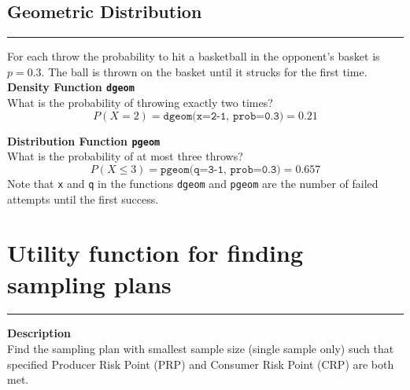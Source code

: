\subsection{Geometric Distribution}
\noindent\rule[\linienAbstand]{\linewidth}{\linienDicke}
For each throw the probability to hit a basketball in the opponent’s basket is $p = 0.3$. The ball is thrown on the basket until it strucks for the first time.
\textbf{Density Function \texttt{dgeom}}\\
What is the probability of throwing exactly two times?
\begin{equation*}
  P(X=2) = \texttt{dgeom(x=2-1, prob=0.3)} = 0.21
\end{equation*}

\textbf{Distribution Function \texttt{pgeom}}\\
What is the probability of at most three throws?
\begin{equation*}
  P(X \leq 3) = \texttt{pgeom(q=3-1, prob=0.3)} = 0.657
\end{equation*}
Note that \texttt{x} and \texttt{q} in the functions \texttt{dgeom} and \texttt{pgeom} are the number of failed attempts until the first success.


\section{Utility function for finding sampling plans}
\noindent\rule[\linienAbstand]{\linewidth}{\linienDicke}
\textbf{Description}\\
Find the sampling plan with smallest sample size (single sample only) such that specified Producer Risk Point (PRP) and Consumer Risk Point (CRP) are both met.

